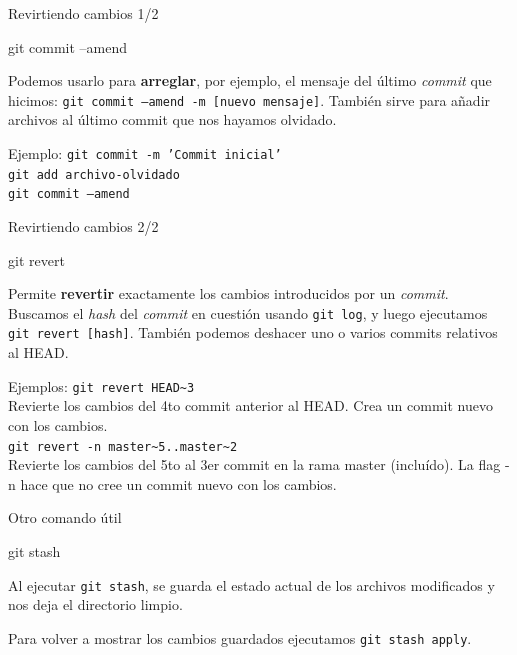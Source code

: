 
\begin{frame}[t]{Revirtiendo cambios 1/2}
    \begin{comando}
        git commit --amend
    \end{comando}

        \begin{block}{}
            Podemos usarlo para \textbf{arreglar}, por ejemplo, el mensaje del último \textit{commit} que hicimos: \texttt{git commit --amend -m [nuevo mensaje]}.
            También sirve para añadir archivos al último commit que nos hayamos olvidado.
        \end{block}
        \pause
        \begin{ejercicio} {Ejemplo:}
        \texttt{git commit -m 'Commit inicial'}\\
        \texttt{git add archivo-olvidado}\\
        \texttt{git commit --amend}
        \end{ejercicio}
\end{frame}
\begin{frame}[t]{Revirtiendo cambios 2/2}
    \begin{comando}
        git revert
    \end{comando}

        \begin{block}{}
            Permite \textbf{revertir} exactamente los cambios introducidos por un \textit{commit}. Buscamos el \textit{hash} del \textit{commit} en cuestión
            usando \texttt{git log}, y luego ejecutamos \texttt{git revert [hash]}. También podemos deshacer uno o varios commits relativos al HEAD.
        \end{block}
    \begin{ejercicio}{Ejemplos:}
        \texttt{git revert HEAD\sim 3}\\
        Revierte los cambios del 4to commit anterior al HEAD. Crea un commit nuevo con los cambios.\\
        \pause
        \texttt{git revert -n master\sim 5..master\sim 2}\\
        Revierte los cambios del 5to al 3er commit en la rama master (incluído). La flag -n hace que no cree un commit nuevo con los cambios.
    \end{ejercicio}
    
\end{frame}

\begin{frame}[t]{Otro comando útil}
    \begin{comando}
        git stash
    \end{comando}

    \pause
    \begin{block}{}
        Al ejecutar \texttt{git stash}, se guarda el estado actual de los archivos modificados y nos deja el directorio limpio.

        \vspace{0.5em}

        Para volver a mostrar los cambios guardados ejecutamos \texttt{git stash apply}.
    \end{block}
\end{frame}

